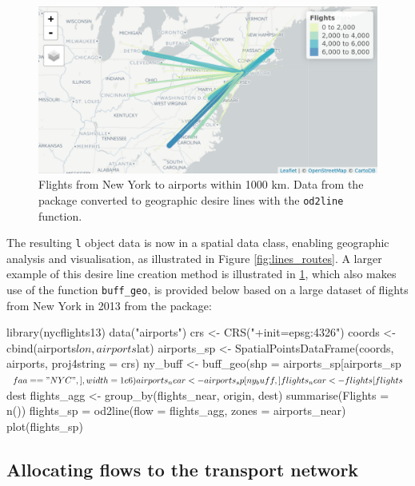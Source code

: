 \begin{figure}
\includegraphics[width=\textwidth]{flights} \caption[Flights from New York]{Flights from New York to airports within 1000 km. Data from the  package converted to geographic desire lines with the \texttt{od2line} function.}\label{fig:flights}
\end{figure}

The resulting \texttt{l} object data is now in a spatial data class, enabling geographic analysis and
visualisation, as illustrated in Figure \ref{fig:lines_routes}.
A larger example of this desire line creation method is illustrated in \ref{fig:flights}, which also makes use of the function \texttt{buff\_geo}, is provided below based on a large dataset of flights from New York in 2013 from the  package:

\begin{Schunk}
\begin{Sinput}
library(nycflights13)
data("airports")
crs <- CRS("+init=epsg:4326")
coords <- cbind(airports$lon, airports$lat)
airports_sp <- SpatialPointsDataFrame(coords, airports, proj4string = crs)
ny_buff <- buff_geo(shp = airports_sp[airports_sp$faa == "NYC",], width = 1e6)
airports_near <- airports_sp[ny_buff,]
flights_near <- flights[flights$dest %
flights_agg <- group_by(flights_near, origin, dest) %
  summarise(Flights = n())
flights_sp = od2line(flow = flights_agg, zones = airports_near)
plot(flights_sp)
\end{Sinput}
\end{Schunk}

\subsection{Allocating flows to the transport
network}\label{allocating-flows-to-the-transport-network}

